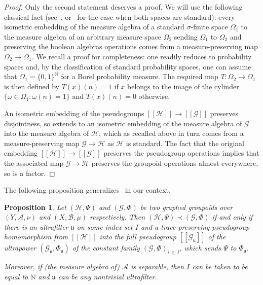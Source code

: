 \documentclass[10pt]{amsart}
\newtheorem{prop}[cdrthm]{Proposition}
\theoremstyle{definition}
\newcommand{\Nmath}{\mathbb{N}}
\newcommand{\cH}{\mathcal{H}}
\newcommand{\ch}{\mathcal{H}}
\newcommand{\cg}{\mathcal{G}}
\newcommand{\ra}{\mathscr{A}}
\newcommand{\rb}{\mathscr{B}}
\newcommand{\ul}{\mathfrak{u}}
\begin{document}
\begin{proof}
Only the second statement deserves a proof. We will use the following classical fact (see~\cite[Theorem~343B]{fremlin2011measure}, or~\cite{vonNeumann32} for the case when both spaces are standard): every isometric embedding of the measure algebra of a standard $\sigma$-finite space $\Omega_1$ to the measure algebra of an arbitrary measure space $\Omega_2$ sending $\Omega_1$ to $\Omega_2$ and preserving the boolean algebras operations comes from a measure-preserving map $\Omega_2 \to \Omega_1$. We recall a proof for completeness: one readily reduces to probability spaces and, by the classification of standard probability spaces, one can assume that $\Omega_1=\{0,1\}^\Nmath$ for a Borel probability measure. The required map $T \colon \Omega_2 \to \Omega_1$ is then defined by $T(x)(n)=1$ if $x$ belongs to the image of the cylinder $\{\omega \in \Omega_1: \omega(n)=1\}$ and $T(x)(n)=0$ otherwise.

An isometric embedding of the pseudogroups $[[\cH]] \to [[\cg]]$ preserves disjointness, so extends to an isometric embedding of the measure algebra of $\cg$ into the measure algebra of $\ch$, which as recalled above in turn comes from a measure-preserving map $\cg \to \ch$ as $\ch$ is standard. The fact that the original embedding $[[\cH]] \to [[\cg]]$ preserves the pseudogroup operations implies that the associated map $\cg \to \ch$ preserves the groupoid operations almost everywhere, so is a factor.
\end{proof}

The following proposition generalizes~\cite[Theorem~1]{CKTD} in our context.

\begin{prop}\label{prop:relation_weakequivalence_factor}
Let $(\cH,\Psi)$ and $(\cg, \Phi)$ be two graphed groupoids over $(Y,\ra, \nu)$ and $(X, \rb, \mu)$ respectively. Then $(\cH,\Psi) \prec (\cg, \Phi)$ if and only if there is an ultrafilter $\ul$ on some index set $I$ and a trace preserving pseudogroup homomorphism from $[[\ch]]$ into the full pseudogroup $[[\cg_\ul]]$ of the ultrapower $(\cg_\ul, \Phi_\ul)$ of the constant family $(\cg, \Phi)_{i\,\in\,I}$, which sends $\Psi$ to $\Phi_\ul$.



Moreover, if (the measure algebra of) $\ra$ is separable, then $I$ can be taken to be equal to $\Nmath$ and $\ul$ can be any nontrivial ultrafilter.
\end{prop}
\end{document}
